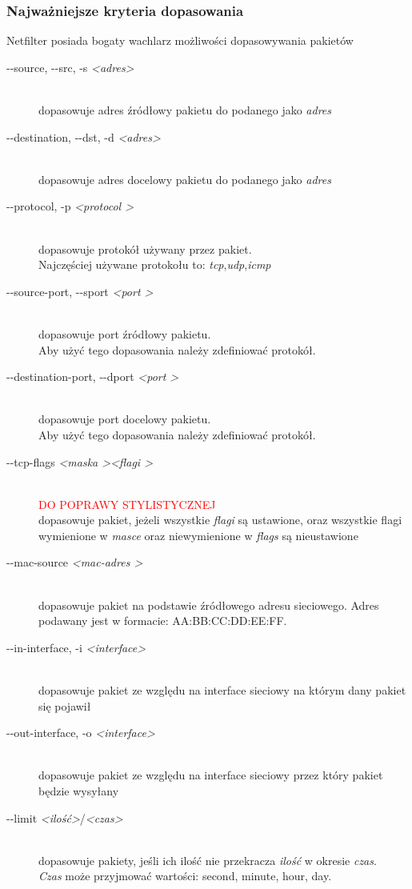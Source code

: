 \documentclass[a4paper,12pt]{book}
\newcommand{\param}[1]{\textit{\textless #1\textgreater}}
\begin{document}
			\subsubsection{Najważniejsze kryteria dopasowania}
				Netfilter posiada bogaty wachlarz możliwości dopasowywania pakietów
				\begin{description}
					\item[-{}-source, -{}-src, -s \param{adres} ] \hfill \\
						dopasowuje adres źródłowy pakietu do podanego jako \textit{adres}
					\item[-{}-destination, -{}-dst, -d \param{adres}] \hfill\\
						dopasowuje adres docelowy pakietu do podanego jako \textit{adres}
					\item[-{}-protocol, -p \textit{\textless protocol \textgreater}] \hfill \\
						dopasowuje protokół używany przez pakiet.\\
						Najczęściej używane protokołu to: \textit{tcp},\textit{udp},\textit{icmp}
					\item[-{}-source-port, -{}-sport \textit{\textless port \textgreater} ]\hfill\\
						dopasowuje port źródłowy pakietu.\\
						Aby użyć tego dopasowania należy zdefiniować protokół.
					\item[-{}-destination-port, -{}-dport \textit{\textless port \textgreater}] \hfill \\
						dopasowuje port docelowy pakietu.\\
						Aby użyć tego dopasowania należy zdefiniować protokół.
					\item[-{}-tcp-flags \textit{\textless maska \textgreater \textless flagi \textgreater}] \hfill \\
						\textcolor{red}{\Large{DO POPRAWY STYLISTYCZNEJ}}\\
						dopasowuje pakiet, jeżeli wszystkie \textit{flagi} są ustawione, oraz wszystkie flagi wymienione w \textit{masce} oraz niewymienione w \textit{flags} są nieustawione
					\item[-{}-mac-source \textit{\textless mac-adres \textgreater}] \hfill \\
						dopasowuje pakiet na podstawie źródłowego adresu sieciowego. Adres podawany jest w formacie: AA:BB:CC:DD:EE:FF.
					\item[-{}-in-interface, -i \param{interface}] \hfill \\
						dopasowuje pakiet ze względu na interface sieciowy na którym dany pakiet się pojawił	
					\item[-{}-out-interface, -o \param{interface}] \hfill \\
						dopasowuje pakiet ze względu na interface sieciowy przez który pakiet będzie wysyłany
					\item[-{}-limit \param{ilość}/\param{czas}] \hfill \\
						dopasowuje pakiety, jeśli ich ilość nie przekracza \textit{ilość} w okresie \textit{czas}.\\
						\textit{Czas} może przyjmować wartości: second, minute, hour, day.
				\end{description}
\end{document}
